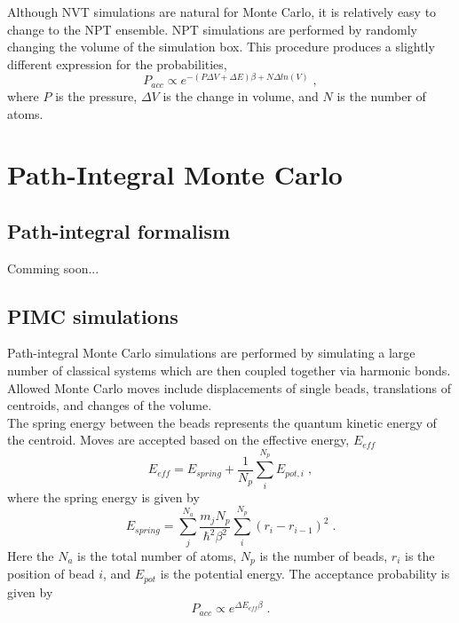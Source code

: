 \documentclass[12pt]{report}
\begin{document}
Although NVT simulations are natural for Monte Carlo, it is relatively easy to
change to the NPT ensemble. NPT simulations are performed by randomly changing
the volume of the simulation box. This procedure produces a slightly
different expression for the probabilities,
\begin{equation}
 P_{acc} \propto e^{-(P\Delta V+\Delta E)\beta+N\Delta ln(V)} \; ,
\end{equation}
where $P$ is the pressure, $\Delta V$ is the change in volume, and $N$ is
the number of atoms.

\section{Path-Integral Monte Carlo}

\subsection{Path-integral formalism}

{\color{red}Comming soon...}

\subsection{PIMC simulations}

Path-integral Monte Carlo simulations are performed by simulating a large
number of classical systems which are then coupled together via harmonic
bonds. Allowed Monte Carlo moves include displacements of single beads,
translations of centroids, and changes of the volume. \\

The spring energy between the beads represents the quantum kinetic energy of
the centroid. Moves are accepted based on the effective energy, $E_{eff}$
\begin{equation}
 E_{eff} = E_{spring}+\frac{1}{N_p}\sum_i^{N_p} E_{pot,i} \; ,
\end{equation}
where the spring energy is given by
\begin{equation}
 E_{spring} = \sum_{j}^{N_a} \frac{m_{j}N_{p}}{\hbar^2\beta^2}
              \sum_{i}^{N_p} (r_{i}-r_{i-1})^2  \; .
\end{equation}
Here the $N_a$ is the total number of atoms, $N_p$ is the number of beads,
$r_i$ is the position of bead $i$, and $E_{pot}$ is the potential energy. The
acceptance probability is given by
\begin{equation}
 P_{acc} \propto e^{\Delta E_{eff}\beta} \; .
\end{equation}
\end{document}
